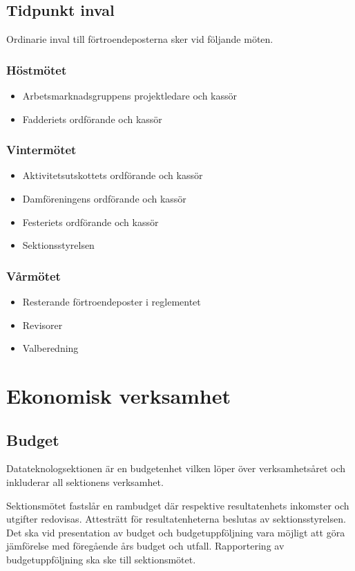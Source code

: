 \documentclass{datateknologsektionen-document}
\begin{document}
\subsection{Tidpunkt inval}
Ordinarie inval till förtroendeposterna sker vid följande möten.

\subsubsection{Höstmötet}
\begin{itemize}
  \item Arbetsmarknadsgruppens projektledare och kassör
  \item Fadderiets ordförande och kassör
\end{itemize}

\subsubsection{Vintermötet}
\begin{itemize}
  \item Aktivitetsutskottets ordförande och kassör
  \item Damföreningens ordförande och kassör
  \item Festeriets ordförande och kassör
  \item Sektionsstyrelsen
\end{itemize}

\subsubsection{Vårmötet}
\begin{itemize}
  \item Resterande förtroendeposter i reglementet
  \item Revisorer
  \item Valberedning
\end{itemize}

\section{Ekonomisk verksamhet}
\subsection{Budget}
Datateknologsektionen är en budgetenhet vilken löper över verksamhetsåret och
inkluderar all sektionens verksamhet.

Sektionsmötet fastslår en rambudget där respektive resultatenhets inkomster och
utgifter redovisas. Attesträtt för resultatenheterna beslutas av sektionsstyrelsen.
Det ska vid presentation av budget och budgetuppföljning vara möjligt att göra
jämförelse med föregående års budget och utfall. Rapportering av budgetuppföljning
ska ske till sektionsmötet.
\end{document}
